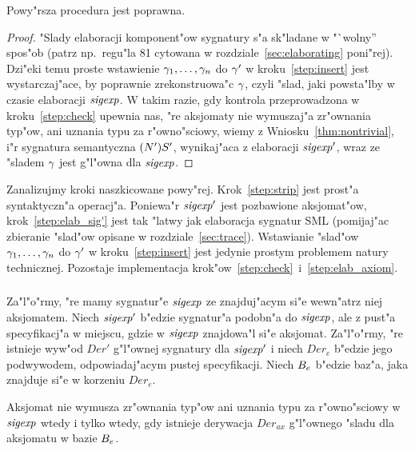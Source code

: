 \begin{thm}
Powy"rsza procedura jest poprawna.
\end{thm}

\begin{proof}
"Slady elaboracji komponent"ow sygnatury s"a sk"ladane w "`wolny'' spos"ob 
(patrz np.\ regu"la 81 cytowana w rozdziale~\ref{sec:elaborating} poni"rej).
Dzi"eki temu proste wstawienie $\gamma_1,\dots,\gamma_n$ 
do $\gamma'$ w kroku~\ref{step:insert} jest wystarczaj"ace,
by poprawnie zrekonstruowa"c $\gamma$, czyli "slad, jaki powsta"lby w czasie elaboracji ${\it sigexp}$.
W takim razie, gdy kontrola przeprowadzona w kroku~\ref{step:check} upewnia nas, 
"re aksjomaty nie wymuszaj"a zr"ownania typ"ow, ani uznania typu za r"owno"sciowy,
wiemy z Wniosku~\ref{thm:nontrivial}, i"r sygnatura semantyczna $(N')S'$, 
wynikaj"aca z elaboracji ${\it sigexp}'$, wraz ze "sladem $\gamma$ jest g"l"owna dla ${\it sigexp}$.
\end{proof}

Zanalizujmy kroki naszkicowane powy"rej.
Krok~\ref{step:strip} jest prost"a syntaktyczn"a operacj"a.
Poniewa"r ${\it sigexp}'$ jest pozbawione aksjomat"ow, krok~\ref{step:elab_sig'} jest tak "latwy
jak elaboracja sygnatur SML (pomijaj"ac zbieranie "slad"ow opisane w rozdziale~\ref{sec:trace}). 
Wstawianie "slad"ow $\gamma_1,\dots,\gamma_n$ do $\gamma'$ w kroku~\ref{step:insert}
jest jedynie prostym problemem natury technicznej.
Pozostaje implementacja krok"ow~\ref{step:check}~i~\ref{step:elab_axiom}.

\subsubsection{\secvalidating}
\label{sec:validating}

Za"l"o"rmy, "re mamy sygnatur"e ${\it sigexp}$ ze znajduj"acym si"e wewn"atrz niej aks\-jo\-ma\-tem.
Niech ${\it sigexp}'$ b"edzie sygnatur"a podobn"a do ${\it sigexp}$, 
ale z pust"a specyfikacj"a w miejscu, gdzie w ${\it sigexp}$ znajdowa"l si"e aksjomat.
Za"l"o"rmy, "re istnieje wyw"od $Der'$ g"l"ownej sygnatury dla ${\it sigexp}'$ i
niech $Der_e$ b"edzie jego podwywodem, odpowiadaj"acym pustej specyfikacji.
Niech $B_e$ b"edzie baz"a, jaka znajduje si"e w korzeniu $Der_e$.

\begin{thm}
\label{thm:validating}
Aksjomat nie wymusza zr"ownania typ"ow ani uznania ty\-pu za r"owno"sciowy w ${\it sigexp}$ 
wtedy i tylko wtedy, gdy istnieje derywacja $Der_{ax}$ g"l"ownego "sladu 
dla aksjomatu w bazie $B_e$. 
\end{thm}

